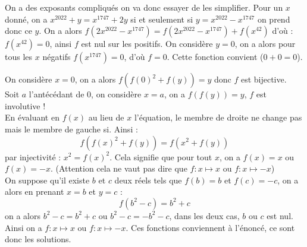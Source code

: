 \begin{sol}[][5]
On a des exposants compliqués on va donc essayer de les simplifier. Pour un $x$ donné, on a $x^{2022}+y=x^{1747}+2y$ si et seulement si $y=x^{2022}-x^{1747}$ on prend donc ce $y$. On a alors $f(2x^{2022}-x^{1747})=f(2x^{2022}-x^{1747})+f(x^{42})$ d'où : $f(x^{42})=0$, ainsi $f$ est nul sur les positifs. On considère $y=0$, on a alors pour tous les $x$ négatifs $f(x^{1747})=0$, d'où $f=0$. Cette fonction convient ($0+0=0$).
\end{sol}
\begin{sol}[][6]
On considère $x=0$, on a alors $f(f(0)^2+f(y))=y$ donc $f$ est bijective.\\
Soit $a$ l'antécédant de $0$, on considère $x=a$, on a $f(f(y))=y$, $f$ est involutive !\\
En évaluant en $f(x)$ au lieu de $x$ l'équation, le membre de droite ne change pas mais le membre de gauche si. Ainsi : $$f(f(x)^2+f(y))=f(x^2+f(y))$$ par injectivité : $x^2=f(x)^2$. Cela signifie que pour tout $x$, on a $f(x)=x$ ou $f(x)=-x$. (Attention cela ne vaut pas dire que $f:x\longmapsto x$ ou $f:x\longmapsto -x$)\\
On suppose qu'il existe $b$ et $c$ deux réels tels que $f(b)=b$ et $f(c)=-c$, on a alors en prenant $x=b$ et $y=c$ : $$f(b^2-c)=b^2+c$$ on a alors $b^2-c=b^2+c$ ou $b^2-c=-b^2-c$, dans les deux cas, $b$ ou $c$ est nul. Ainsi on a $f:x\longmapsto x$ ou $f:x\longmapsto -x$. Ces fonctions conviennent à l'énoncé, ce sont donc les solutions.
\end{sol}

